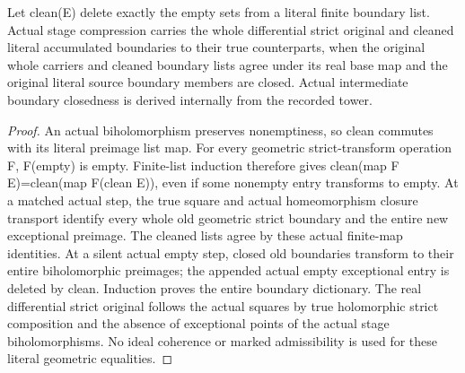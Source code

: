 \begin{lemma}
\label{hir:general-nc-open-cleaned-whole-boundary-dictionary}
\leanok
Let clean(E) delete exactly the empty sets from a literal finite boundary list.
Actual stage compression carries the whole differential strict original and
cleaned literal accumulated boundaries to their true counterparts, when the
original whole carriers and cleaned boundary lists agree under its real base
map and the original literal source boundary members are closed. Actual
intermediate boundary closedness is derived internally from the recorded tower.
\end{lemma}
\begin{proof}
An actual biholomorphism preserves nonemptiness, so clean commutes with its
literal preimage list map. For every geometric strict-transform operation F,
F(empty) is empty. Finite-list induction therefore gives
clean(map F E)=clean(map F(clean E)), even if some nonempty entry transforms
to empty. At a matched actual step, the true square and actual homeomorphism
closure transport identify every whole old geometric strict boundary and the
entire new exceptional preimage. The cleaned lists agree by these actual
finite-map identities. At a silent actual empty step, closed old boundaries
transform to their entire biholomorphic preimages; the appended actual empty
exceptional entry is deleted by clean. Induction proves the entire boundary
dictionary. The real differential strict original follows the actual squares
by true holomorphic strict composition and the absence of exceptional points
of the actual stage biholomorphisms. No ideal coherence or marked admissibility
is used for these literal geometric equalities.
\end{proof}

